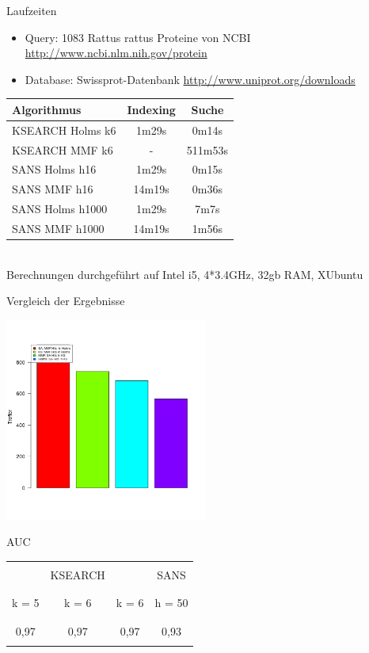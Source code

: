 \documentclass[xcolor=dvipsnames, aspectratio=1610]{beamer}
\begin{document}
\begin{frame}{Laufzeiten}
  \begin{itemize}
    \item Query: 1083 Rattus rattus Proteine von NCBI \tiny{\url{http://www.ncbi.nlm.nih.gov/protein}}
    \item \normalsize{Database: Swissprot-Datenbank} \tiny{\url{http://www.uniprot.org/downloads}}
  \end{itemize}
  \begin{tabular}{l|cc}
    Algorithmus & Indexing & Suche \\
    \hline
    KSEARCH Holms k6 & 1m29s & 0m14s \\
    KSEARCH MMF k6 & -  & 511m53s \\
     SANS Holms h16 & 1m29s &  0m15s \\
       SANS MMF  h16 & 14m19s & 0m36s \\
     SANS Holms h1000 & 1m29s & 7m7s \\
       SANS MMF  h1000 & 14m19s & 1m56s \\
  \end{tabular}\\
  \tiny{Berechnungen durchgeführt auf Intel i5, 4*3.4GHz, 32gb RAM, XUbuntu}
\end{frame}

\begin{frame}{Vergleich der Ergebnisse}
  \begin{center}
    \includegraphics[width=0.5\textwidth]{img/barplot2.png}
  \end{center}
\end{frame}

\begin{frame}{AUC}
  \begin{center}
    \begin{tabular}{ccc|c}
      &&&\\
      &KSEARCH& & SANS\\
      &&&\\
      \hline
      &&&\\
      k = 5 & k = 6 & k = 6 & h = 50 \\
      &&&\\
      \hline
      &&&\\
      0,97 & 0,97 & 0,97 & 0,93 \\
      &&&\\
    \end{tabular}\\
  \end{center}
\end{frame}
\end{document}
